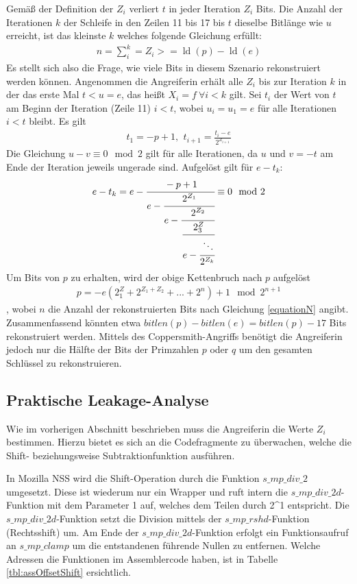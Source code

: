 Gemäß der Definition der $Z_i$ verliert $t$ in jeder Iteration $Z_i$ Bits. 
Die Anzahl der Iterationen $k$ der Schleife in den Zeilen 11 bis 17 bis $t$ dieselbe Bitlänge wie $u$ erreicht, ist das kleinste $k$ welches folgende Gleichung erfüllt: 
\begin{align}
\label{equationN}
n = \sum\limits_i^k = Z_i >= \operatorname{ld}(p) - \operatorname{ld}(e)
\end{align}
Es stellt sich also die Frage, wie viele Bits in diesem Szenario rekonstruiert werden können.
Angenommen die Angreiferin erhält alle $Z_i$ bis zur Iteration $k$ in der das erste Mal $t<u=e$, das heißt $X_i=f \: \forall i < k$ gilt.
Sei $t_i$ der Wert von $t$ am Beginn der Iteration (Zeile 11) $i<t$, wobei $u_i=u_1=e$ für alle Iterationen $i<t$ bleibt.
Es gilt 
\begin{align}
t_1=-p+1 \text{, } \: t_{i+1} = \frac{t_i - e}{2^{Z_{i+1}}}
\end{align}
Die Gleichung $u-v \equiv 0 \mod 2$ gilt für alle Iterationen, da $u$ und $v=-t$ am Ende der Iteration jeweils ungerade sind.
Aufgelöst gilt für $e-t_k$:
\begin{align}
e-t_k = e- \cfrac{-p+1}{e - \cfrac{2^{Z_1}}{e- \cfrac{2^{Z_2}}{
          \cfrac{2^Z_3}{e - \cfrac{\ddots}{2^{Z_k}}}}}} \equiv 0 \mod 2
\end{align}
Um Bits von $p$ zu erhalten, wird der obige Kettenbruch nach $p$ aufgelöst
\begin{align}
p = -e(2^Z_1+2^{Z_1+Z_2}+...+2^n)+1 \mod 2^{n+1}
\end{align}
, wobei $n$ die Anzahl der rekonstruierten Bits nach Gleichung \ref{equationN} angibt.
Zusammenfassend könnten etwa $bitlen(p)-bitlen(e)=bitlen(p)-17$ Bits rekonstruiert werden.
Mittels des Coppersmith-Angriffs \cite{CoppersmithBound} benötigt die Angreiferin jedoch nur die Hälfte der Bits der Primzahlen $p$ oder $q$ um den gesamten Schlüssel zu rekonstruieren.

\subsection{Praktische Leakage-Analyse}

Wie im vorherigen Abschnitt beschrieben muss die Angreiferin die Werte $Z_i$ bestimmen.
Hierzu bietet es sich an die Codefragmente zu überwachen, welche die Shift- beziehungsweise Subtraktionfunktion ausführen.

In Mozilla NSS wird die Shift-Operation durch die Funktion $s\_mp\_div\_2$ umgesetzt.
Diese ist wiederum nur ein Wrapper und ruft intern die $s\_mp\_div\_2d$-Funktion mit dem Parameter 1 auf, welches dem Teilen durch 2^1 entspricht.
Die $s\_mp\_div\_2d$-Funktion setzt die Division mittels der $s\_mp\_rshd$-Funktion (Rechtsshift) um. 
Am Ende der $s\_mp\_div\_2d$-Funktion erfolgt ein Funktionsaufruf an $s\_mp\_clamp$ um die entstandenen führende Nullen zu entfernen.
Welche Adressen die Funktionen im Assemblercode haben, ist in Tabelle \ref{tbl:assOffsetShift} ersichtlich. 

